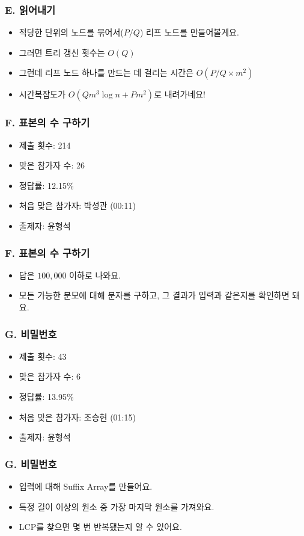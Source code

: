 \documentclass[xetex]{beamer}
\begin{document}
\begin{frame}
  \frametitle{E. 읽어내기}
  \begin{itemize}
    \item 적당한 단위의 노드를 묶어서($P/Q$) 리프 노드를 만들어볼게요.
    \item 그러면 트리 갱신 횟수는 $O(Q)$
    \item 그런데 리프 노드 하나를 만드는 데 걸리는 시간은 $O(P/Q \times m^{2})$
    \item 시간복잡도가 $O(Qm^{3}\log n + Pm^{2})$로 내려가네요!
  \end{itemize}
\end{frame}

\begin{frame}
  \frametitle{F. 표본의 수 구하기}
  \begin{itemize}
    \item 제출 횟수: 214
    \item 맞은 참가자 수: 26
    \item 정답률: 12.15\%
    \item 처음 맞은 참가자: 박성관 (00:11)
    \item 출제자: 윤형석
  \end{itemize}
\end{frame}

\begin{frame}
  \frametitle{F. 표본의 수 구하기}
  \begin{itemize}
    \item 답은 $100,000$ 이하로 나와요.
    \item 모든 가능한 분모에 대해 분자를 구하고, 그 결과가 입력과 같은지를 확인하면 돼요.
  \end{itemize}
\end{frame}

\begin{frame}
  \frametitle{G. 비밀번호}
  \begin{itemize}
    \item 제출 횟수: 43
    \item 맞은 참가자 수: 6
    \item 정답률: 13.95\%
    \item 처음 맞은 참가자: 조승현 (01:15)
    \item 출제자: 윤형석
  \end{itemize}
\end{frame}

\begin{frame}
  \frametitle{G. 비밀번호}
  \begin{itemize}
    \item 입력에 대해 Suffix Array를 만들어요.
    \item 특정 길이 이상의 원소 중 가장 마지막 원소를 가져와요.
    \item LCP를 찾으면 몇 번 반복됐는지 알 수 있어요.
  \end{itemize}
\end{frame}
\end{document}
